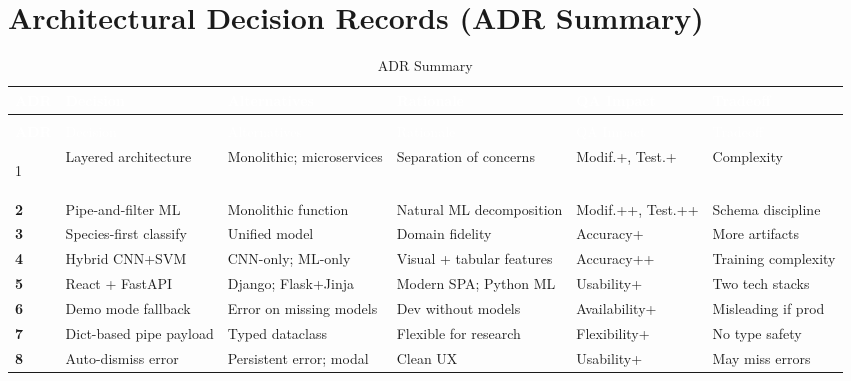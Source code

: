 \documentclass[11pt,a4paper,oneside]{report}
\begin{document}
\newpage
\section{Architectural Decision Records (ADR Summary)}

\begin{longtable}{>{\bfseries\scriptsize}p{0.7cm} >{\scriptsize}p{2.2cm} >{\scriptsize}p{2.5cm} >{\scriptsize}p{3cm} >{\scriptsize}p{1.8cm} >{\scriptsize}p{2cm}}
\caption{ADR Summary} \label{tab:adr-summary} \\
\toprule
\rowcolor{tableheader}
\textcolor{white}{ADR} & \textcolor{white}{Decision} & \textcolor{white}{Alternatives} & \textcolor{white}{Rationale} & \textcolor{white}{QA Impact} & \textcolor{white}{Tradeoff} \\
\midrule
\endfirsthead
\multicolumn{6}{c}{\scriptsize\tablename\ \thetable{} -- continued} \\
\toprule
\rowcolor{tableheader}
\textcolor{white}{ADR} & \textcolor{white}{Decision} & \textcolor{white}{Alternatives} & \textcolor{white}{Rationale} & \textcolor{white}{QA Impact} & \textcolor{white}{Tradeoff} \\
\midrule
\endhead
\bottomrule
\endlastfoot

1 & Layered architecture & Monolithic; microservices & Separation of concerns & Modif.+, Test.+ & Complexity \\
\rowcolor{tablerow}
2 & Pipe-and-filter ML & Monolithic function & Natural ML decomposition & Modif.++, Test.++ & Schema discipline \\
3 & Species-first classify & Unified model & Domain fidelity & Accuracy+ & More artifacts \\
\rowcolor{tablerow}
4 & Hybrid CNN+SVM & CNN-only; ML-only & Visual + tabular features & Accuracy++ & Training complexity \\
5 & React + FastAPI & Django; Flask+Jinja & Modern SPA; Python ML & Usability+ & Two tech stacks \\
\rowcolor{tablerow}
6 & Demo mode fallback & Error on missing models & Dev without models & Availability+ & Misleading if prod \\
7 & Dict-based pipe payload & Typed dataclass & Flexible for research & Flexibility+ & No type safety \\
\rowcolor{tablerow}
8 & Auto-dismiss error & Persistent error; modal & Clean UX & Usability+ & May miss errors \\

\end{longtable}
\end{document}
